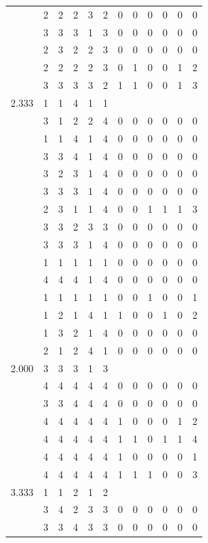 \documentclass[]{msu-thesis}
\theoremstyle{definition}
\theoremstyle{definition}
\theoremstyle{definition}
\theoremstyle{remark}
\begin{document}
\begin{table}
{\begin{tabular}[t]{rrrrrrrrrrrr}
 & 2 & 2 & 2 & 3 & 2 & 0 & 0 & 0 & 0 & 0 & 0\\
 & 3 & 3 & 3 & 1 & 3 & 0 & 0 & 0 & 0 & 0 & 0\\
 & 2 & 3 & 2 & 2 & 3 & 0 & 0 & 0 & 0 & 0 & 0\\
 & 2 & 2 & 2 & 2 & 3 & 0 & 1 & 0 & 0 & 1 & 2\\
 & 3 & 3 & 3 & 3 & 2 & 1 & 1 & 0 & 0 & 1 & 3\\
2.333 & 1 & 1 & 4 & 1 & 1 &  &  &  &  &  & \\
 & 3 & 1 & 2 & 2 & 4 & 0 & 0 & 0 & 0 & 0 & 0\\
 & 1 & 1 & 4 & 1 & 4 & 0 & 0 & 0 & 0 & 0 & 0\\
 & 3 & 3 & 4 & 1 & 4 & 0 & 0 & 0 & 0 & 0 & 0\\
 & 3 & 2 & 3 & 1 & 4 & 0 & 0 & 0 & 0 & 0 & 0\\
 & 3 & 3 & 3 & 1 & 4 & 0 & 0 & 0 & 0 & 0 & 0\\
 & 2 & 3 & 1 & 1 & 4 & 0 & 0 & 1 & 1 & 1 & 3\\
 & 3 & 3 & 2 & 3 & 3 & 0 & 0 & 0 & 0 & 0 & 0\\
 & 3 & 3 & 3 & 1 & 4 & 0 & 0 & 0 & 0 & 0 & 0\\
 & 1 & 1 & 1 & 1 & 1 & 0 & 0 & 0 & 0 & 0 & 0\\
 & 4 & 4 & 4 & 1 & 4 & 0 & 0 & 0 & 0 & 0 & 0\\
 & 1 & 1 & 1 & 1 & 1 & 0 & 0 & 1 & 0 & 0 & 1\\
 & 1 & 2 & 1 & 4 & 1 & 1 & 0 & 0 & 1 & 0 & 2\\
 & 1 & 3 & 2 & 1 & 4 & 0 & 0 & 0 & 0 & 0 & 0\\
 & 2 & 1 & 2 & 4 & 1 & 0 & 0 & 0 & 0 & 0 & 0\\
2.000 & 3 & 3 & 3 & 1 & 3 &  &  &  &  &  & \\
 & 4 & 4 & 4 & 4 & 4 & 0 & 0 & 0 & 0 & 0 & 0\\
 & 3 & 3 & 4 & 4 & 4 & 0 & 0 & 0 & 0 & 0 & 0\\
 & 4 & 4 & 4 & 4 & 4 & 1 & 0 & 0 & 0 & 1 & 2\\
 & 4 & 4 & 4 & 4 & 4 & 1 & 1 & 0 & 1 & 1 & 4\\
 & 4 & 4 & 4 & 4 & 4 & 1 & 0 & 0 & 0 & 0 & 1\\
 & 4 & 4 & 4 & 4 & 4 & 1 & 1 & 1 & 0 & 0 & 3\\
3.333 & 1 & 1 & 2 & 1 & 2 &  &  &  &  &  & \\
 & 3 & 4 & 2 & 3 & 3 & 0 & 0 & 0 & 0 & 0 & 0\\
 & 3 & 3 & 4 & 3 & 3 & 0 & 0 & 0 & 0 & 0 & 0\\

\end{tabular}}
\end{table}
\end{document}
